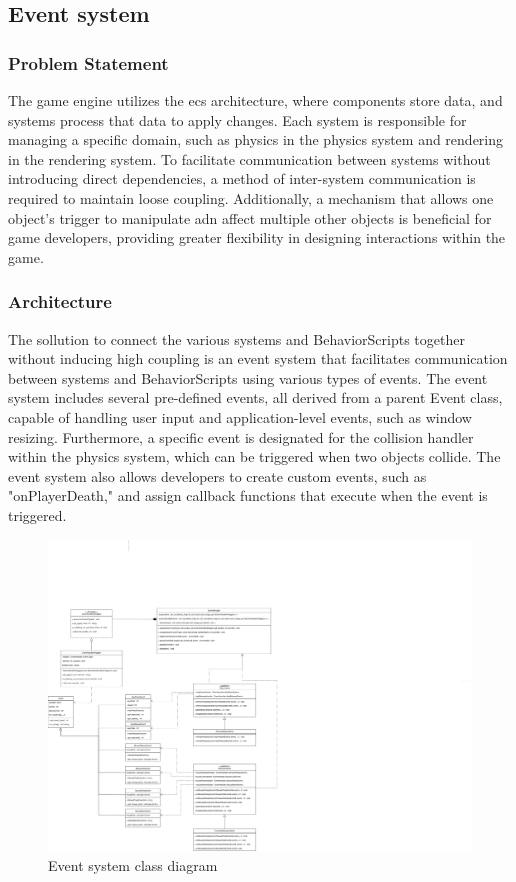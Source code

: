 \documentclass{projdoc}
\begin{document}
\subsection{Event system}

\subsubsection{Problem Statement}

The game engine utilizes the \gls{ecs} architecture, where components store data, and
systems process that data to apply changes. Each system is responsible for managing a
specific domain, such as physics in the physics system and rendering in the rendering
system. To facilitate communication between systems without introducing direct
dependencies, a method of inter-system communication is required to maintain loose
coupling. Additionally, a mechanism that allows one object's trigger to manipulate
adn affect multiple other objects is beneficial for game developers, providing
greater flexibility in designing interactions within the game.

\subsubsection{Architecture}

The sollution to connect the various systems and BehaviorScripts together without
inducing high coupling is an event system that facilitates communication between
systems and BehaviorScripts using various types of events. The event system includes
several pre-defined events, all derived from a parent Event class, capable of
handling user input and application-level events, such as window resizing.
Furthermore, a specific event is designated for the collision handler within the
physics system, which can be triggered when two objects collide. The event system
also allows developers to create custom events, such as "onPlayerDeath," and assign
callback functions that execute when the event is triggered.

\begin{figure}
	\centering
	\includegraphics[width=\linewidth]{img/event-uml.drawio.png}
	\caption{Event system class diagram}
	\label{fig:event-uml}
\end{figure}
\end{document}
